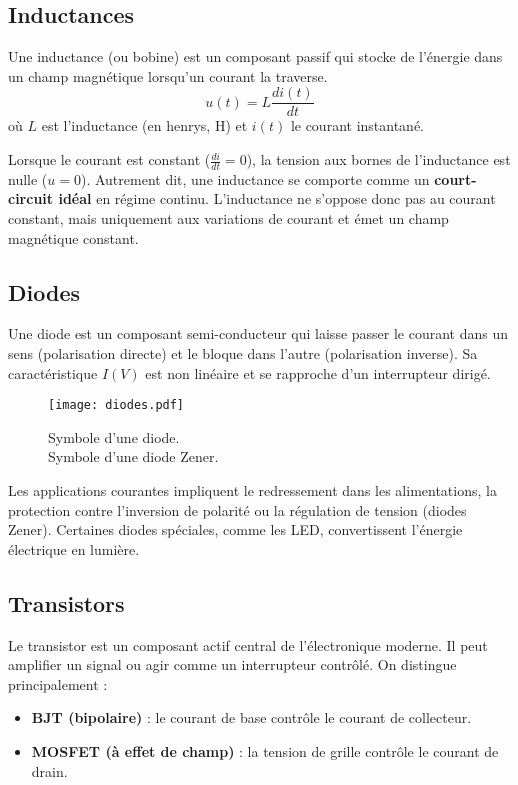 \subsection{Inductances} \label{subsec:inductors}
Une inductance (ou bobine) est un composant passif qui stocke de l’énergie
dans un champ magnétique lorsqu’un courant la traverse.
\[
u(t) = L \frac{di(t)}{dt}
\]
où \(L\) est l’inductance (en henrys, \unit{\henry}) et \(i(t)\) le courant instantané.

\vspace{\baselineskip}
Lorsque le courant est constant (\(\frac{di}{dt} = 0\)), la tension aux bornes
de l’inductance est nulle (\(u = 0\)). Autrement dit, une inductance se comporte
comme un \textbf{court-circuit idéal} en régime continu. L’inductance ne s’oppose
donc pas au courant constant, mais uniquement aux variations de courant et \'emet un champ
magnétique constant.


\subsection{Diodes} \label{subsec:diodes}
Une diode est un composant semi-conducteur qui laisse passer le courant
dans un sens (polarisation directe) et le bloque dans l’autre (polarisation inverse).
Sa caractéristique \(I(V)\) est non linéaire et se rapproche
d’un interrupteur dirigé.
\begin{figure}[H]
    \centering
    \texttt{[image: diodes.pdf]}
    \caption{\newline
         Symbole d’une diode.\\
         Symbole d’une diode Zener.
    }
\end{figure}
Les applications courantes impliquent le redressement dans les alimentations, la protection contre l’inversion de polarité
ou la régulation de tension (diodes Zener).
Certaines diodes spéciales, comme les LED, convertissent l’énergie électrique en lumière.

\subsection{Transistors} \label{subsec:transistors}
Le transistor est un composant actif central de l’électronique moderne.
Il peut amplifier un signal ou agir comme un interrupteur contrôlé.
On distingue principalement :
\begin{itemize}
  \item \textbf{BJT (bipolaire)} : le courant de base contrôle
  le courant de collecteur.
  \item \textbf{MOSFET (à effet de champ)} : la tension de grille contrôle
  le courant de drain.
\end{itemize}

